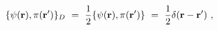 \begin{equation}
\{\psi ({\bf r}),\pi ({\bf r^{\prime }})\}_{D}\ =\ {\frac{1}{2}}\{\psi ({\bf %
r}),\pi ({\bf r^{\prime }})\}\ =\ {\frac{1}{2}}\delta ({\bf r}-{\bf %
r^{\prime }})\ ,  \label{DB3}
\end{equation}%
